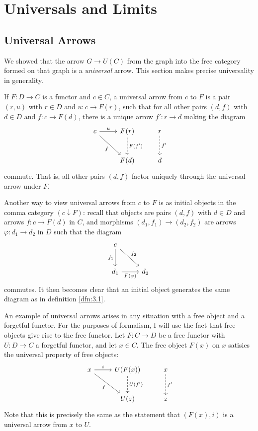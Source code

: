 \chapter{Universals and Limits}

\section{Universal Arrows}

We showed that the arrow $G\to U(C)$ from the graph into the free category formed on that graph is a \emph{universal} arrow. This section makes precise universality in generality.

\begin{definition}\label{dfn:3.1}
	If $F : D \to C$ is a functor and $c\in C$, a universal arrow from $c$ to $F$ is a pair $(r,u)$ with $r\in D$ and $u : c \to F(r)$, such that for all other pairs $(d,f)$ with $d\in D$ and $f : c \to F(d)$, there is a unique arrow $f': r \to d$ making the diagram
	\[\begin{tikzcd}[row sep = 2.5em, column sep = 2.5em]
	c\ar[" u ", r] \ar[" f "', dr]  & F(r)\ar[" F(f') ", dashed, d]  & r\ar[" f' ", dashed, d]  \\
	 & F(d) & d
	\end{tikzcd}\]
	commute. That is, all other pairs $(d,f)$ factor uniquely through the universal arrow under $F$.
\end{definition}

Another way to view universal arrows from $c$ to $F$ is as initial objects in the comma category $(c\downarrow F)$: recall that objects are pairs $(d,f)$ with $d\in D$ and arrows $f : c \to F(d)$ in $C$, and morphisms $(d_1,f_1)\to (d_2,f_2)$ are arrows $\varphi : d_1 \to d_2$ in $D$ such that the diagram
\[\begin{tikzcd}[row sep = 2.5em, column sep = 2.5em]
c\ar[" f_1 "', d] \ar[" f_2 ", dr]  &  \\
d_1\ar[" F(\varphi ) "', r]  & d_2
\end{tikzcd}\]
commutes. It then becomes clear that an initial object generates the same diagram as in definition \ref{dfn:3.1}.

An example of universal arrows arises in any situation with a free object and a forgetful functor. For the purposes of formalism, I will use the fact that free objects give rise to the free functor. Let $F : C \to D$ be a free functor with $U : D \to C$ a forgetful functor, and let $x\in C$. The free object $F(x)$ on $x$ satisies the universal property of free objects:
\[\begin{tikzcd}[row sep = 2.5em, column sep = 2.5em]
x\ar[" i ", r] \ar[" f "', dr]  & U(F(x))\ar[" U(f')", dashed, d] & x\ar[" f' ", dashed, d]  \\
 & U(z) & z
\end{tikzcd}\]
Note that this is precisely the same as the statement that $(F(x),i)$ is a universal arrow from $x$ to $U$.

